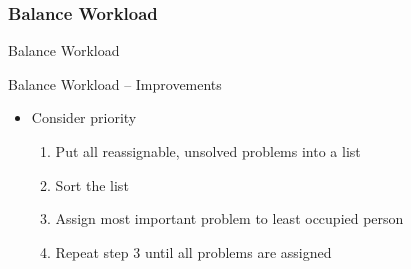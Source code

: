 \subsubsection*{Balance Workload}
\begin{frame}{Balance Workload}
\end{frame}

\begin{frame}{Balance Workload -- Improvements}

\begin{itemize}
	\item Consider priority

	\begin{enumerate}
		\item<2-> Put all reassignable, unsolved problems into a list
		\item<3-> Sort the list
		\item<4-> Assign most important problem to least occupied person
		\item<5-> Repeat step 3 until all problems are assigned
	\end{enumerate}

\end{itemize}

\end{frame}